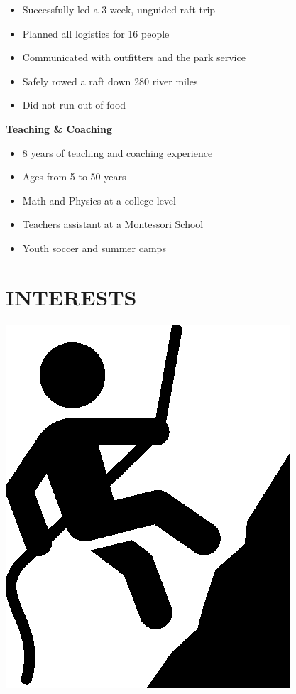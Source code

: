 \documentclass[12pt]{resume}
\begin{document}
\begin{minipage}[t]{0.48\textwidth}
\begin{spacing}{1.05}
            \begin{itemize}
                \setlength\itemsep{.2em}
                \item {Successfully led a 3 week, unguided raft trip}
                \item{Planned all logistics for 16 people}
                \item{Communicated with outfitters and the park service}
                \item {Safely rowed a raft down 280 river miles}
                \item {Did not run out of food}
            \end{itemize}
            \vspace{1.5mm}
            {\par \bf Teaching \& Coaching}
            \vspace{1.5mm}
            \begin{itemize}
                \setlength\itemsep{.2em}
                \item {8 years of teaching and coaching experience}
                \item{Ages from 5 to 50 years}
                \item{Math and Physics at a college level}
                \item {Teachers assistant at a Montessori School}
                \item {Youth soccer and summer camps}
            \end{itemize}
            \vspace{-7mm}
        {\section* {INTERESTS}}
    \begin{minipage}[t]{0.1\textwidth}
        {\par \includegraphics[scale=.1]{climber}}\\

\end{minipage}
\end{spacing}
\end{minipage}
\end{document}
